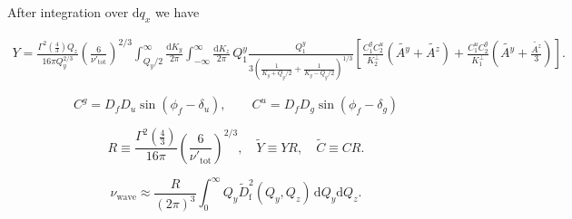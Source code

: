 \documentclass[prb,singlecolumn]{revtex4}
\begin{document}
After integration over $\mathrm{d}q_x$ we have

\begin{eqnarray}
  Y = \frac{\Gamma^2(\frac43)Q_z}{16\pi Q_y^{2/3}}\left(\frac6{\nu'_\mathrm{tot}}\right)^{2/3} \int_{Q_y/2}^\infty \frac{\mathrm{d}K_y}{2\pi} \int_{-\infty}^\infty \frac{\mathrm{d}K_z}{2\pi} \, Q_1^y 
 \frac{Q_1^y}{3\left( \frac1{K_y + Q_y/2} + \frac1{K_y - Q_y/2} \right)^{1/3}} 
 \left[\frac{C_1^g C_2^u}{K_2^\perp}(\tilde{A^y} + \tilde{A^z}) + \frac{C_1^u C_2^g}{K_1^\perp}(\tilde{A^y} + \frac{\tilde{A^z}}3 ) \right] .\nonumber
\end{eqnarray}

\begin{equation}
 C^g = D_f D_u \sin(\phi_f - \delta_u),\qquad C^u = D_f D_g \sin(\phi_f - \delta_g)
\end{equation}

$$ R \equiv \frac{\Gamma^2(\frac43)}{16\pi}\left(\frac6{\nu'_\mathrm{tot}}\right)^{2/3},\quad  \tilde{Y} \equiv YR,\quad \tilde{C} \equiv CR. $$

\begin{equation}
\nu_\mathrm{wave}  \approx\frac{R}{(2\pi)^3}\int_0^\infty Q_y \tilde{D}_\mathrm{f}^2(Q_y,Q_z)\,\mathrm{d}Q_y\mathrm{d}Q_z .
\end{equation}
\end{document}
